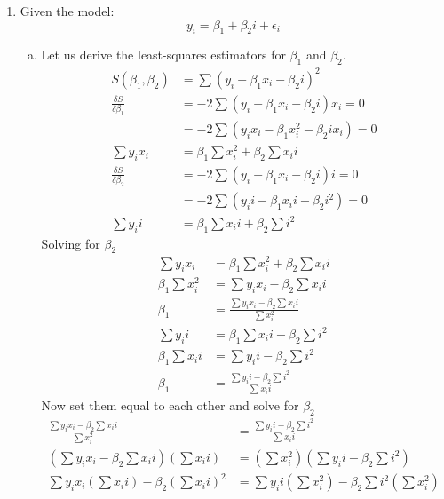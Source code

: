 \documentclass[12pt]{article}
\begin{document}
\begin{enumerate}[1.]
    \item Given the model:
        \[ y_i = \beta_1 + \beta_2 i + \epsilon_i \]
        \begin{enumerate}[(a)]
            \item Let us derive the least-squares estimators for $\beta_1$ and $\beta_2$.
            \begin{align*}
                S(\beta_1, \beta_2) &= \sum  (y_i - \beta_1 x_i - \beta_2 i)^2 \\
                \frac{\delta S}{\delta \beta_1} &= -2 \sum  (y_i - \beta_1 x_i - \beta_2 i)x_i = 0 \\
                &= -2 \sum  (y_i x_i - \beta_1 x_i^2 - \beta_2 i x_i)  = 0 \\
                \sum  y_i x_i &= \beta_1\sum  x_i^2 + \beta_2\sum  x_i i \\ 
                \frac{\delta S}{\delta \beta_2} &= -2 \sum  (y_i - \beta_1 x_i - \beta_2 i)i = 0 \\
                &= -2 \sum  (y_i i - \beta_1 x_i i - \beta_2 i^2) = 0 \\
                \sum  y_i i &= \beta_1\sum  x_i i + \beta_2\sum  i^2 
            \end{align*}
            Solving for $\beta_2$
            \begin{align*}
                \sum  y_i x_i &= \beta_1\sum  x_i^2 + \beta_2\sum  x_i i\\ 
                \beta_1\sum  x_i^2 &= \sum  y_i x_i - \beta_2\sum  x_i i \\ 
                \beta_1 &= \frac{\sum  y_i x_i - \beta_2\sum  x_i i}{\sum  x_i^2} \\ 
                \sum  y_i i &= \beta_1\sum  x_i i + \beta_2\sum  i^2 \\ 
                \beta_1\sum  x_i i &= \sum  y_i i - \beta_2\sum  i^2 \\ 
                \beta_1 &= \frac{ \sum  y_i i - \beta_2\sum  i^2}{\sum  x_i i}
            \end{align*}
            Now set them equal to each other and solve for $\beta_2$
            \begin{align*}
                \frac{\sum  y_i x_i - \beta_2\sum  x_i i}{\sum  x_i^2} &= \frac{ \sum  y_i i - \beta_2\sum  i^2}{\sum  x_i i} \\
                (\sum  y_i x_i - \beta_2\sum  x_i i) (\sum  x_i i) &= (\sum  x_i^2)(\sum  y_i i - \beta_2\sum  i^2) \\
                \sum  y_i x_i (\sum  x_i i) - \beta_2(\sum  x_i i)^2  &= \sum  y_i i (\sum  x_i^2) - \beta_2\sum  i^2 (\sum  x_i^2) \\

\end{align*}
\end{enumerate}
\end{enumerate}
\end{document}

